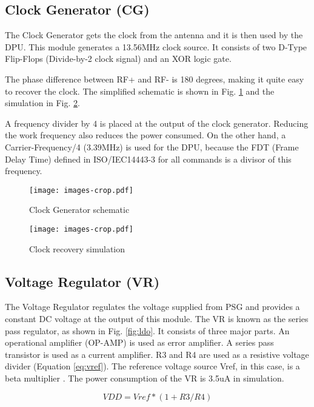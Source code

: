\subsection{Clock Generator (CG)}

The Clock Generator gets the clock from the antenna and it is then used by the DPU. This module generates a 13.56MHz clock source. It consists of two D-Type Flip-Flops (Divide-by-2 clock signal) and an XOR logic gate. 

The phase difference between RF+ and RF- is 180 degrees, making it quite easy to recover the clock. The simplified schematic is shown in Fig. \ref{fig:clk} and the simulation in Fig. \ref{fig:clk_sim}.

A frequency divider by 4 is placed at the output of the clock generator. Reducing the work frequency also reduces the power consumed. On the other hand, a Carrier-Frequency/4 (3.39MHz) is used for the DPU, because the FDT (Frame Delay Time) defined in ISO/IEC14443-3 for all commands is a divisor of this frequency.
 

\begin{figure}[]
  \centering
  \texttt{[image: images-crop.pdf]}
  \caption{Clock Generator schematic}
  \label{fig:clk}
\end{figure}

\begin{figure}[h]
  \centering
  \texttt{[image: images-crop.pdf]}
  \caption{Clock recovery simulation}
  \label{fig:clk_sim}
\end{figure}


\subsection{Voltage Regulator (VR)}

The Voltage Regulator \cite{rfid_ldo} regulates the voltage supplied from PSG and provides a constant DC voltage at the output of this module. The VR is known as the series pass regulator, as shown in Fig. \ref{fig:ldo}. It consists of three major parts. An operational amplifier (OP-AMP) is used as error amplifier. A series pass transistor is used as a current amplifier. R3 and R4 are used as a resistive voltage divider (Equation \ref{eq:vref}). The reference voltage source Vref, in this case, is a beta multiplier \cite{panadero}. The power consumption of the VR is 3.5uA in simulation. 

\begin{equation} \label{eq:vref}
VDD = Vref*(1+R3/R4)
\end{equation}

